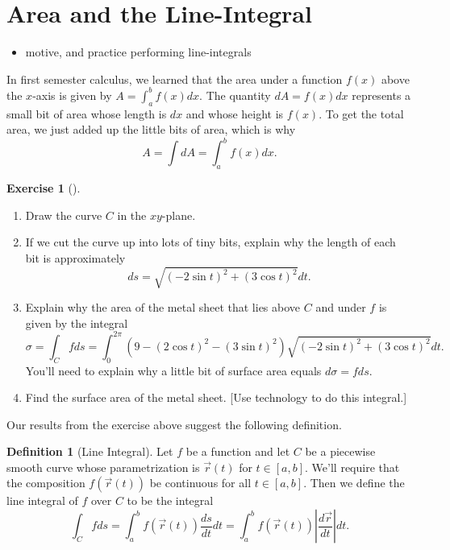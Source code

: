 \documentclass[10pt,]{book}
\theoremstyle{plain}
\theoremstyle{definition}
\newtheorem{definition}[theorem]{Definition}
\theoremstyle{definition}
\theoremstyle{definition}
\theoremstyle{definition}
\newtheorem{exploration}[project]{Exercise}
\theoremstyle{definition}
\numberwithin{equation}{section}
\begin{document}
\section[{Area and the Line-Integral}]{Area and the Line-Integral}\label{section-30}
\leavevmode%
\begin{itemize}[label=\textbullet]
\item{}motive, and practice performing line-integrals%
\end{itemize}
In first semester calculus, we learned that the area under a function \(f(x)\) above the \(x\)-axis is given by \(A = \int_a^b f(x) dx\). The quantity \(dA= f(x) dx\) represents a small bit of area whose length is \(dx\) and whose height is \(f(x)\). To get the total area, we just added up the little bits of area, which is why%
\begin{equation*}
A=\int dA = \int_a^b f(x) dx.
\end{equation*}
%
\begin{exploration}[]\label{exploration-197}
\leavevmode%
\begin{enumerate}[font=\bfseries,label=(\alph*),ref=\alph*]
\item\label{task-500} Draw the curve \(C\) in the \(xy\)-plane.%
\item\label{task-501} If we cut the curve up into lots of tiny bits, explain why the length of each bit is approximately%
\begin{equation*}
ds=\sqrt{(-2\sin t)^2+(3\cos t)^2}dt.
\end{equation*}
%
\item\label{task-502} Explain why the area of the metal sheet that lies above \(C\) and under \(f\) is given by the integral%
\begin{equation*}
\sigma = \int_C f ds = \int_0^{2\pi}(9-(2\cos t)^2-(3\sin t)^2)\sqrt{(-2\sin t)^2+(3\cos t)^2}dt.
\end{equation*}
You'll need to explain why a little bit of surface area equals \(d\sigma =fds\).%
\item\label{task-503} Find the surface area of the metal sheet. [Use technology to do this integral.]%
\end{enumerate}
\end{exploration}
Our results from the exercise above suggest the following definition.%
\begin{definition}[{Line Integral}]\label{definition-34}
Let \(f\) be a function and let \(C\) be a piecewise smooth curve whose parametrization is \(\vec r(t)\) for \(t\in[a,b]\). We'll require that the composition \(f(\vec r(t))\) be continuous for all \(t\in [a,b]\). Then we define the line integral of \(f\) over \(C\) to be the integral%
\begin{equation*}
\int_C f ds 
= \int_a^b f(\vec r(t))\frac{ds}{dt}dt
= \int_a^b f(\vec r(t))\left|\frac{d\vec r}{dt}\right|dt.
\end{equation*}
%
\end{definition}
\end{document}
